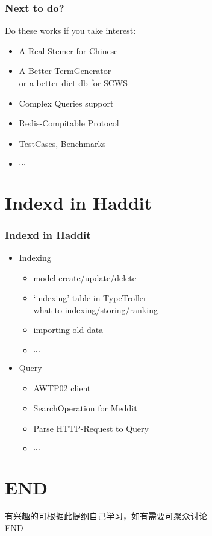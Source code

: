\documentclass[unicode]{beamer}
\begin{document}
\begin{CJK}{UTF8}{gbsn}
  \begin{frame}
    \frametitle{Next to do?}
    Do these works if you take interest: \vfill
    \begin{itemize}
    \item A Real Stemer for Chinese
    \item A Better TermGenerator \\
      {\tiny or a better dict-db for SCWS}
    \item Complex Queries support
    \item Redis-Compitable Protocol
    \item TestCases, Benchmarks
    \item $\cdots$
    \end{itemize}
  \end{frame}

  \section{Indexd in Haddit}
  \begin{frame}
    \frametitle{Indexd in Haddit}
    \begin{itemize}
    \item Indexing
      \begin{itemize}
      \item model-create/update/delete
      \item `indexing' table in TypeTroller \\
        {\tiny what to indexing/storing/ranking}
      \item importing old data
      \item $\cdots$
      \end{itemize}
      \vfill
    \item Query
      \begin{itemize}
      \item AWTP02 client
      \item SearchOperation for Meddit
      \item Parse HTTP-Request to Query
      \item $\cdots$
      \end{itemize}
    \end{itemize}
  \end{frame}

  \section{END}
  \begin{frame}
    \begin{center}
      {\tiny 有兴趣的可根据此提纲自己学习，如有需要可聚众讨论}\\\vfill
      {\Huge END}
    \end{center}
  \end{frame}

\end{CJK}
\end{document}
